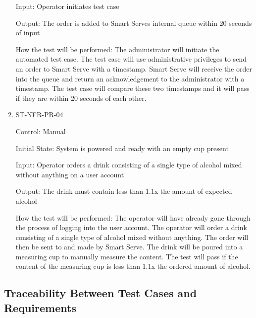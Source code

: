 \documentclass[12pt, titlepage]{article}
\begin{document}
\begin{enumerate}
Input: Operator initiates test case

Output: The order is added to Smart Serves internal queue within 20 seconds of input

How the test will be performed: The administrator will initiate the automated test case. The test case will use administrative privileges to send an order to Smart Serve with a timestamp. Smart Serve will receive the order into the queue and return an acknowledgement to the administrator with a timestamp. The test case will compare these two timestamps and it will pass if they are within 20 seconds of each other.

\item{ST-NFR-PR-04\\}

Control: Manual

Initial State: System is powered and ready with an empty cup present

Input: Operator orders a drink consisting of a single type of alcohol mixed without anything on a user account

Output: The drink must contain less than 1.1x the amount of expected alcohol

How the test will be performed: The operator will have already gone through the process of logging into the user account. The operator will order a drink consisting of a single type of alcohol mixed without anything. The order will then be sent to and made by Smart Serve. The drink will be poured into a measuring cup to manually measure the content. The test will pass if the content of the measuring cup is less than 1.1x the ordered amount of alcohol.


\end{enumerate}

\subsection{Traceability Between Test Cases and Requirements}

\end{document}
